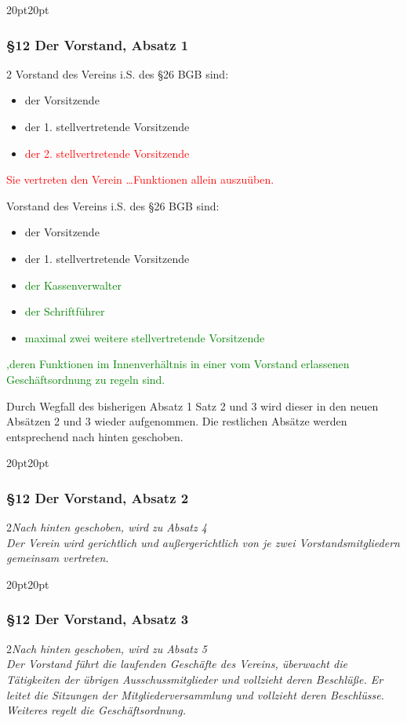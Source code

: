 \documentclass[10pt,a4paper,parskip=half]{scrartcl}
\newcommand{\new}[1]{\textcolor{Green}{#1}}
\newcommand{\old}[1]{\textcolor{Red}{#1}}
\newcommand{\change}[1]{
  \begin{adjustwidth}{20pt}{20pt}
    #1
  \end{adjustwidth}
}
\newcommand{\compare}[3]{\change{\subsubsection*{#1}\begin{multicols}{2}#2\columnbreak\\#3\end{multicols}}}
\begin{document}
\change{
  \subsubsection*{§12 Der Vorstand, Absatz 1}
  \begin{multicols}{2}
    Vorstand des Vereins i.S. des §26 BGB sind:
    \begin{itemize}[noitemsep]
      \item der Vorsitzende
      \item der 1. stellvertretende Vorsitzende
      \item \old{der 2. stellvertretende Vorsitzende}
    \end{itemize}
    \old {Sie vertreten den Verein \dots Funktionen allein auszuüben.}

    \columnbreak
    Vorstand des Vereins i.S. des §26 BGB sind:
    \begin{itemize}[noitemsep]
      \item der Vorsitzende
      \item der 1. stellvertretende Vorsitzende
      \item \new{der Kassenverwalter}
      \item \new{der Schriftführer}
      \item \new{maximal zwei weitere stellvertretende Vorsitzende}
    \end{itemize}
    \new{,deren Funktionen im Innenverhältnis in einer vom Vorstand erlassenen Geschäftsordnung zu regeln sind.}
  \end{multicols}
}

Durch Wegfall des bisherigen Absatz 1 Satz 2 und 3 wird dieser in den neuen Absätzen 2 und 3 wieder aufgenommen. Die restlichen Absätze werden entsprechend nach hinten geschoben.

\compare{§12 Der Vorstand, Absatz 2}
{\em Nach hinten geschoben, wird zu Absatz 4\em}
{Der Verein wird gerichtlich und außergerichtlich von je zwei Vorstandsmitgliedern gemeinsam vertreten.}

\clearpage
\compare{§12 Der Vorstand, Absatz 3}
{\em Nach hinten geschoben, wird zu Absatz 5\em}
{Der Vorstand führt die laufenden Geschäfte des Vereins, überwacht die Tätigkeiten der übrigen Ausschussmitglieder und vollzieht deren Beschlüße.
  Er leitet die Sitzungen der Mitgliederversammlung und vollzieht deren Beschlüsse. Weiteres regelt die Geschäftsordnung.}
\end{document}
